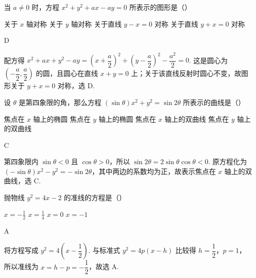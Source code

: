 \begin{problem}
当 \(a \neq 0\) 时，方程 \(x^2 + y^2 + ax - ay = 0\) 所表示的图形是（\quad）

\choices
    {关于 \(x\) 轴对称}
    {关于 \(y\) 轴对称}
    {关于直线 \(y - x = 0\) 对称}
    {关于直线 \(y + x = 0\) 对称}
\end{problem}

\begin{answer}
D
\end{answer}

\begin{solution}
配方得 \(x^2+ax+y^2-ay=\left(x+\dfrac a2\right)^2+\left(y-\dfrac a2\right)^2-\dfrac{a^2}{2}=0\). 这是圆心为 \(\left(-\dfrac a2,\dfrac a2\right)\) 的圆，且圆心在直线 \(x+y=0\) 上；关于该直线反射时圆心不变，故图形关于 \(y+x=0\) 对称，选 D.
\end{solution}

\begin{problem}
设 \(\theta\) 是第四象限的角，那么方程 \((\sin \theta)x^2 + y^2 = \sin 2\theta\) 所表示的曲线是（\quad）

\choices
    {焦点在 \(x\) 轴上的椭圆}
    {焦点在 \(y\) 轴上的椭圆}
    {焦点在 \(x\) 轴上的双曲线}
    {焦点在 \(y\) 轴上的双曲线}
\end{problem}

\begin{answer}
C
\end{answer}

\begin{solution}
第四象限内 \(\sin\theta<0\) 且 \(\cos\theta>0\)，所以 \(\sin2\theta=2\sin\theta\cos\theta<0\). 原方程化为
\(\left(-\sin\theta\right)x^2-y^2=-\sin2\theta\)，其中两边的系数均为正，故表示焦点在 \(x\) 轴上的双曲线，选 C.
\end{solution}

\begin{problem}
抛物线 \(y^2 = 4x - 2\) 的准线的方程是（\quad）

\choices
    {\(x = -\frac{1}{2}\)}
    {\(x = \frac{1}{4}\)}
    {\(x = 0\)}
    {\(x = -1\)}
\end{problem}

\begin{answer}
A
\end{answer}

\begin{solution}
将方程写成 \(y^2=4\left(x-\dfrac12\right)\). 与标准式 \(y^2=4p(x-h)\) 比较得 \(h=\dfrac12\)，\(p=1\)，所以准线为 \(x=h-p=-\dfrac12\)，故选 A.
\end{solution}

